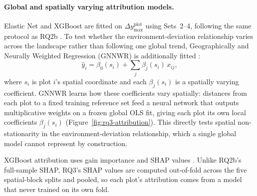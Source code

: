 \documentclass[11pt,a4paper]{report}
\begin{document}
\paragraph*{Global and spatially varying attribution models.}
Elastic Net and XGBoost are fitted on $\Delta y_{\max}^{\text{plot}}$ using Sets~2--4, following the same protocol as RQ2b \citep{zou2005Regularization_C4_NN, chen2016XGBoost_C4_NN}. To test whether the environment-deviation relationship varies across the landscape rather than following one global trend, Geographically and Neurally Weighted Regression (GNNWR) is additionally fitted \citep{du2020Geographically_C6_GWR}:
\begin{equation}
\hat{y}_i = \beta_0(s_i) + \sum_j \beta_j(s_i)\,x_{ij},
\label{eq:gnnwr}
\end{equation}
where $s_i$ is plot $i$'s spatial coordinate and each $\beta_j(s_i)$ is a spatially varying coefficient. GNNWR learns how these coefficients vary spatially: distances from each plot to a fixed training reference set feed a neural network that outputs multiplicative weights on a frozen global OLS fit, giving each plot its own local coefficients $\beta_j(s_i)$ (Figure~\ref{fig:rq3-attribution}). This directly tests spatial non-stationarity in the environment-deviation relationship, which a single global model cannot represent by construction.

XGBoost attribution uses gain importance and SHAP values \citep{lundberg2017}. Unlike RQ2b's full-sample SHAP, RQ3's SHAP values are computed out-of-fold across the five spatial-block splits and pooled, so each plot's attribution comes from a model that never trained on its own fold.
\end{document}
